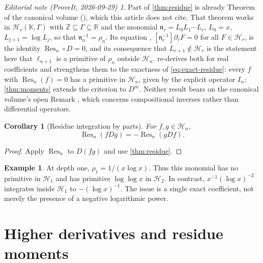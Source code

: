 \documentclass[11pt,a4paper]{article}
\numberwithin{equation}{section}
\newtheorem{corollary}[corollary]{Corollary}
\theoremstyle{definition}
\newtheorem{example}[example]{Example}
\theoremstyle{remark}
\newtheorem*{ednote}{Editorial note (ProveIt, 2026-09-29)}
\newcommand{\R}{\mathbb R}
\newcommand{\HH}{\mathcal H}
\newcommand{\Res}{\operatorname{Res}}
\begin{document}
\begin{ednote}\label{ed:tower-strict}
Part of \cref{thm:residue} is already Theorem  of the canonical volume (), which this article does not cite. That theorem works in $\mathcal H_r(\mathbb K,\Gamma)$ with $\mathbb Z\subseteq\Gamma\subseteq\R$ and the monomial $\mathfrak n_r=L_0L_1\cdots L_r$, $L_0=x$, $L_{j+1}=\log L_j$, so that $\mathfrak n_n^{-1}=\rho_n$. Its equation , $[\mathfrak n_r^{-1}]\partial_rF=0$ for all $F\in\mathcal H_r$, is the identity $\Res_n\circ D=0$, and its consequence that $L_{r+1}\notin\mathcal H_r$ is the statement here that $\ell_{n+1}$ is a primitive of $\rho_n$ outside $\HH_n$.  re-derives both for real coefficients and strengthens them to the exactness of \eqref{eq:exact-residue}: every $f$ with $\Res_n(f)=0$ has a primitive in $\HH_n$, given by the explicit operator $I_n$; \cref{thm:moments} extends the criterion to $D^m$. Neither result bears on the canonical volume's open Remark , which concerns compositional inverses rather than differential operators.
\end{ednote}

\begin{corollary}[Residue integration by parts]
\label{cor:ibp}
For $f,g\in\HH_n$,
\begin{equation}
 \Res_n(fDg)=-\Res_n(gDf).
 \label{eq:ibp}
\end{equation}
\end{corollary}
\begin{proof}
Apply $\Res_n$ to $D(fg)$ and use \cref{thm:residue}.
\end{proof}

\begin{example}
At depth one, $\rho_1=1/(x\log x)$. Thus this monomial has no primitive in $\HH_1$ and has primitive $\log\log x$ in $\HH_2$. In contrast, $x^{-1}(\log x)^{-2}$ integrates inside $\HH_1$ to $-(\log x)^{-1}$. The issue is a single exact coefficient, not merely the presence of a negative logarithmic power.
\end{example}

\section{Higher derivatives and residue moments}
\label{sec:moments}
\end{document}
